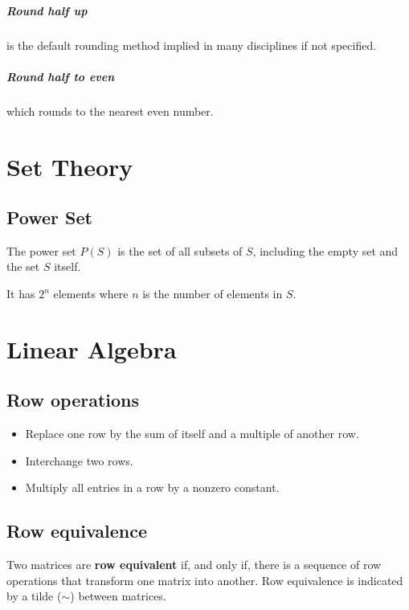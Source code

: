 \documentclass[oneside]{book}
\begin{document}
\paragraph{Round half up} is the default rounding method implied in many
disciplines if not specified.
\paragraph{Round half to even} which rounds to the nearest even number.

\chapter{Set Theory}
\section{Power Set}
The power set \(P(S)\) is the set of all subsets of \(S\), including the empty
set and the set \(S\) itself.

It has \(2^n\) elements where \(n\) is the number of elements in \(S\).

\chapter{Linear Algebra}

\section{Row operations}
\begin{itemize}
\item{Replace one row by the sum of itself and a multiple of another row.}
\item{Interchange two rows.}
\item{Multiply all entries in a row by a nonzero constant.}
\end{itemize}

\section{Row equivalence}
Two matrices are \textbf{row equivalent} if, and only if, there is a sequence
of row operations that transform one matrix into another.
Row equivalence is indicated by a tilde (\(\sim\)) between matrices.
\end{document}
